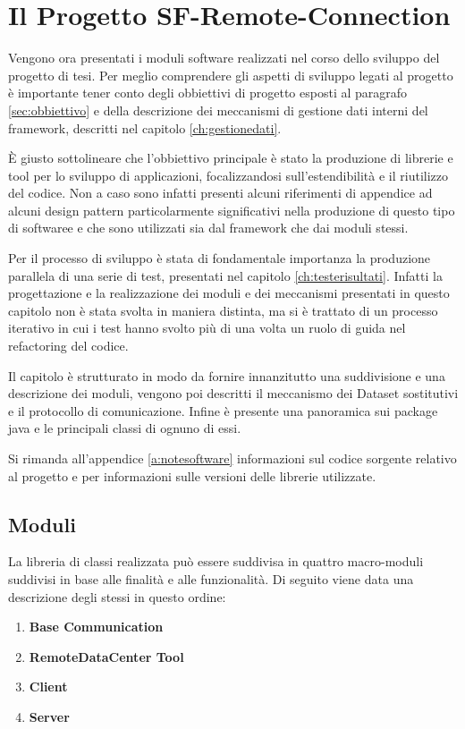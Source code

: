 
\chapter{Il Progetto SF-Remote-Connection}
\label{ch:sfremoteconnection}

Vengono ora presentati i moduli software realizzati nel corso dello sviluppo del progetto di tesi.
Per meglio comprendere gli aspetti di sviluppo legati al progetto è importante tener conto degli obbiettivi di progetto esposti al paragrafo \ref{sec:obbiettivo} e della descrizione dei meccanismi di gestione dati interni del framework, descritti nel capitolo \ref{ch:gestionedati}.

È giusto sottolineare che l'obbiettivo principale è stato la produzione di librerie e tool per lo sviluppo di applicazioni, focalizzandosi sull'estendibilità e il riutilizzo del codice. Non a caso sono infatti presenti alcuni riferimenti di appendice ad alcuni design pattern particolarmente significativi nella produzione di questo tipo di softwaree e che sono utilizzati sia dal framework che dai moduli stessi.

Per il processo di sviluppo è stata di fondamentale importanza la produzione parallela di una serie di test, presentati nel capitolo \ref{ch:testerisultati}. Infatti la progettazione e la realizzazione dei moduli e dei meccanismi presentati in questo capitolo non è stata svolta in maniera distinta, ma si è trattato di un processo iterativo in cui i test hanno svolto più di una volta un ruolo di guida nel refactoring del codice.

Il capitolo è strutturato in modo da fornire 
innanzitutto una suddivisione e una descrizione dei moduli, 
vengono poi descritti il meccanismo dei Dataset sostitutivi
e il protocollo di comunicazione.
Infine è presente una panoramica sui package java e le principali classi di ognuno di essi.

Si rimanda all'appendice \ref{a:notesoftware} informazioni sul codice sorgente relativo al progetto e per informazioni sulle versioni delle librerie utilizzate.

\section{Moduli} 
\label{sec:moduli}
La libreria di classi realizzata può essere suddivisa in quattro macro-moduli suddivisi in base alle finalità e alle funzionalità.
Di seguito viene data una descrizione degli stessi in questo ordine:
\begin{enumerate}
	\item \textbf{Base Communication}
	\item \textbf{RemoteDataCenter Tool}
	\item \textbf{Client}
	\item \textbf{Server}
\end{enumerate}

